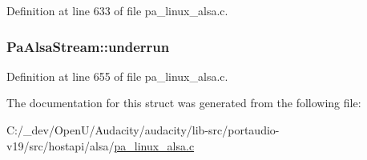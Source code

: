 Definition at line 633 of file pa\+\_\+linux\+\_\+alsa.\+c.

\subsubsection[{\texorpdfstring{underrun}{underrun}}]{ Pa\+Alsa\+Stream\+::underrun}\hypertarget{struct_pa_alsa_stream_a1158444fe763d7def459e7e7d99bedb1}{}\label{struct_pa_alsa_stream_a1158444fe763d7def459e7e7d99bedb1}


Definition at line 655 of file pa\+\_\+linux\+\_\+alsa.\+c.



The documentation for this struct was generated from the following file\+:\begin{DoxyCompactItemize}
\item 
C\+:/\+\_\+dev/\+Open\+U/\+Audacity/audacity/lib-\/src/portaudio-\/v19/src/hostapi/alsa/\hyperlink{pa__linux__alsa_8c}{pa\+\_\+linux\+\_\+alsa.\+c}\end{DoxyCompactItemize}
